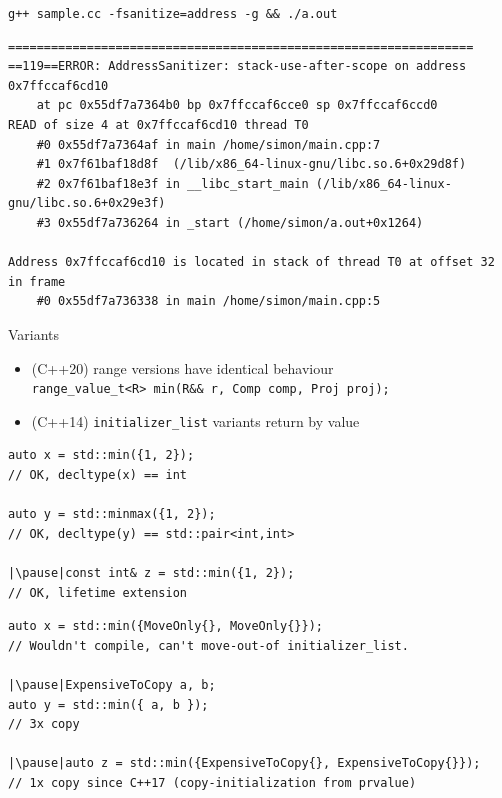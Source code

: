 \documentclass[aspectratio=169]{beamer}
\begin{document}
\begin{frame}[fragile,c]
\texttt{g++ sample.cc -fsanitize=address -g && ./a.out}
\vspace{2em}
\begin{tiny}
\begin{verbatim}
=================================================================
==119==ERROR: AddressSanitizer: stack-use-after-scope on address 0x7ffccaf6cd10
    at pc 0x55df7a7364b0 bp 0x7ffccaf6cce0 sp 0x7ffccaf6ccd0
READ of size 4 at 0x7ffccaf6cd10 thread T0
    #0 0x55df7a7364af in main /home/simon/main.cpp:7
    #1 0x7f61baf18d8f  (/lib/x86_64-linux-gnu/libc.so.6+0x29d8f)
    #2 0x7f61baf18e3f in __libc_start_main (/lib/x86_64-linux-gnu/libc.so.6+0x29e3f)
    #3 0x55df7a736264 in _start (/home/simon/a.out+0x1264)

Address 0x7ffccaf6cd10 is located in stack of thread T0 at offset 32 in frame
    #0 0x55df7a736338 in main /home/simon/main.cpp:5
\end{verbatim}
\end{tiny}
\end{frame}

\begin{frame}{Variants}
\begin{itemize}
    \item \pause (C++20) range versions have identical behaviour\newline\\
    \small\texttt{range_value_t<R> min(R&& r, Comp comp, Proj proj);}\newline\\
    \item \pause(C++14) \texttt{initializer_list} variants return by value
\end{itemize}
\end{frame}

\begin{frame}[fragile]{}
\begin{verbatim}
auto x = std::min({1, 2});
// OK, decltype(x) == int

auto y = std::minmax({1, 2});
// OK, decltype(y) == std::pair<int,int>

|\pause|const int& z = std::min({1, 2});
// OK, lifetime extension

\end{verbatim}
\end{frame}

\begin{frame}[fragile]{}
\begin{verbatim}
auto x = std::min({MoveOnly{}, MoveOnly{}});
// Wouldn't compile, can't move-out-of initializer_list.

|\pause|ExpensiveToCopy a, b;
auto y = std::min({ a, b });
// 3x copy

|\pause|auto z = std::min({ExpensiveToCopy{}, ExpensiveToCopy{}});
// 1x copy since C++17 (copy-initialization from prvalue)
\end{verbatim}
\end{frame}
\end{document}
